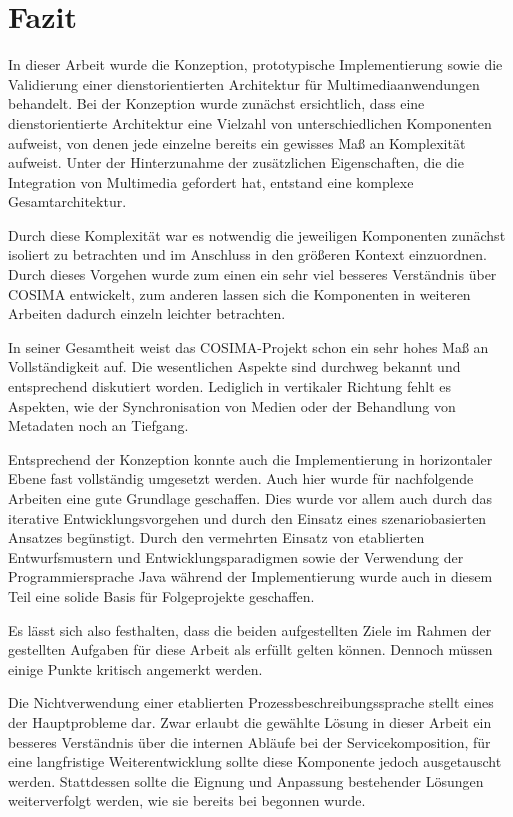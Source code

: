 \chapter{Fazit} %
\label{cha:fazit}

  In dieser Arbeit wurde die Konzeption, prototypische Implementierung sowie die Validierung einer dienstorientierten Architektur für Multimediaanwendungen behandelt. Bei der Konzeption wurde zunächst ersichtlich, dass eine dienstorientierte Architektur eine Vielzahl von unterschiedlichen Komponenten aufweist, von denen jede einzelne bereits ein gewisses Maß an Komplexität aufweist. Unter der Hinterzunahme der zusätzlichen Eigenschaften, die die Integration von Multimedia gefordert hat, entstand eine komplexe Gesamtarchitektur.
  
  Durch diese Komplexität war es notwendig die jeweiligen Komponenten zunächst isoliert zu betrachten und im Anschluss in den größeren Kontext einzuordnen. Durch dieses Vorgehen wurde zum einen ein sehr viel besseres Verständnis über COSIMA entwickelt, zum anderen lassen sich die Komponenten in weiteren Arbeiten dadurch einzeln leichter betrachten.
  
  In seiner Gesamtheit weist das COSIMA-Projekt schon ein sehr hohes Maß an Vollständig\-keit auf. Die wesentlichen Aspekte sind durchweg bekannt und entsprechend diskutiert worden. Lediglich in vertikaler Richtung fehlt es Aspekten, wie der Synchronisation von Medien oder der Behandlung von Metadaten noch an Tiefgang.
  
  Entsprechend der Konzeption konnte auch die Implementierung in horizontaler Ebene fast vollständig umgesetzt werden. Auch hier wurde für nachfolgende Arbeiten eine gute Grundlage geschaffen. Dies wurde vor allem auch durch das iterative Entwicklungsvorgehen und durch den Einsatz eines szenariobasierten Ansatzes begünstigt. Durch den vermehrten Einsatz von etablierten Entwurfsmustern und Entwicklungsparadigmen sowie der Verwendung der Programmiersprache Java während der Implementierung wurde auch in diesem Teil eine solide Basis für Folgeprojekte geschaffen.
  
  Es lässt sich also festhalten, dass die beiden aufgestellten Ziele im Rahmen der gestellten Aufgaben für diese Arbeit als erfüllt gelten können. Dennoch müssen einige Punkte kritisch angemerkt werden.
  
  Die Nichtverwendung einer etablierten Prozessbeschreibungssprache stellt eines der Hauptprobleme dar. Zwar erlaubt die gewählte Lösung in dieser Arbeit ein besseres Verständnis über die internen Abläufe bei der Servicekomposition, für eine langfristige Weiterentwicklung sollte diese Komponente jedoch ausgetauscht werden. Stattdessen sollte die Eignung und Anpassung bestehender Lösungen weiterverfolgt werden, wie sie bereits bei \citep{samma08} begonnen wurde.
  
